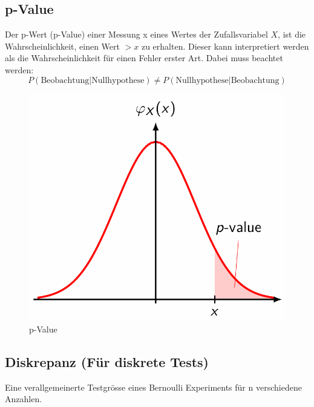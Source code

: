 \documentclass[../Main.tex]{subfiles}
\begin{document}
\subsection{p-Value}
Der p-Wert (p-Value) einer Messung x eines Wertes
der Zufallsvariabel \(X\), ist die Wahrscheinlichkeit,
einen Wert \(> x\) zu erhalten.
Dieser kann interpretiert werden als die Wahrscheinlichkeit für einen Fehler erster Art.
Dabei muss beachtet werden:
\begin{equation*}
    P(\text{Beobachtung}|\text{Nullhypothese}) \neq P(\text{Nullhypothese}|\text{Beobachtung})
\end{equation*}

\begin{figure}[H]
    \centering
    \includegraphics[width=0.5\linewidth]{Images/p-value.png}
    \caption{p-Value}
\end{figure}

\subsection{Diskrepanz (Für diskrete Tests)}
Eine verallgemeinerte Testgrösse eines Bernoulli Experiments für
n verschiedene Anzahlen.
\end{document}
